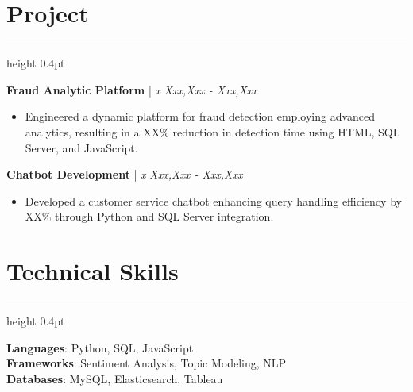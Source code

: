 \documentclass[a4paper,9pt]{article}
\newcommand{\sectionrule}{
    \vspace{0.5em}
    \hrule height 0.4pt
    \vspace{0.5em}
}
\begin{document}
\vspace{0.8em}

\section*{\Large Project}
\sectionrule
\noindent
\textbf{Fraud Analytic Platform} | \textit{x} \hfill \textit{Xxx,Xxx - Xxx,Xxx}
\begin{itemize}
    \item Engineered a dynamic platform for fraud detection employing advanced analytics, resulting in a XX\% reduction in detection time using HTML, SQL Server, and JavaScript.
\end{itemize}

\vspace{0.8em}

\noindent
\textbf{Chatbot Development} | \textit{x} \hfill \textit{Xxx,Xxx - Xxx,Xxx}
\begin{itemize}
    \item Developed a customer service chatbot enhancing query handling efficiency by XX\% through Python and SQL Server integration.
\end{itemize}

\vspace{0.8em}

\section*{\Large Technical Skills}
\sectionrule
\noindent
\textbf{Languages}: Python, SQL, JavaScript \\
\textbf{Frameworks}: Sentiment Analysis, Topic Modeling, NLP \\
\textbf{Databases}: MySQL, Elasticsearch, Tableau
\end{document}
